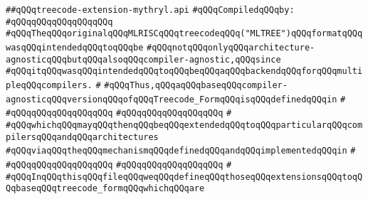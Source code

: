 \label{src/lib/compiler/back/low/main/nextcode/treecode-extension-mythryl.api}
\verb|##qQQqtreecode-extension-mythryl.api|\newline
\newline
\verb|#qQQqCompiledqQQqby:|\newline
\verb|#qQQqqQQqqQQqqQQqqQQq|\newline
\newline
\verb|#qQQqTheqQQqoriginalqQQqMLRISCqQQqtreecodeqQQq("MLTREE")qQQqformatqQQqwasqQQqintendedqQQqtoqQQqbe|\newline
\verb|#qQQqnotqQQqonlyqQQqarchitecture-agnosticqQQqbutqQQqalsoqQQqcompiler-agnostic,qQQqsince|\newline
\verb|#qQQqitqQQqwasqQQqintendedqQQqtoqQQqbeqQQqaqQQqbackendqQQqforqQQqmultipleqQQqcompilers.|\newline
\verb|#|\newline
\verb|#qQQqThus,qQQqaqQQqbaseqQQqcompiler-agnosticqQQqversionqQQqofqQQqTreecode_FormqQQqisqQQqdefinedqQQqin|\newline
\verb|#|\newline
\verb|#qQQqqQQqqQQqqQQqqQQq|\newline
\verb|#qQQqqQQqqQQqqQQqqQQq|\newline
\verb|#|\newline
\verb|#qQQqwhichqQQqmayqQQqthenqQQqbeqQQqextendedqQQqtoqQQqparticularqQQqcompilersqQQqandqQQqarchitectures|\newline
\verb|#qQQqviaqQQqtheqQQqmechanismqQQqdefinedqQQqandqQQqimplementedqQQqin|\newline
\verb|#|\newline
\verb|#qQQqqQQqqQQqqQQqqQQq|\newline
\verb|#qQQqqQQqqQQqqQQqqQQq|\newline
\verb|#|\newline
\verb|#qQQqInqQQqthisqQQqfileqQQqweqQQqdefineqQQqthoseqQQqextensionsqQQqtoqQQqbaseqQQqtreecode_formqQQqwhichqQQqare|\newline
